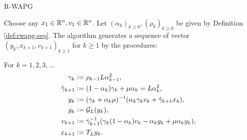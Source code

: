 \documentclass[11pt]{beamer}
\theoremstyle{definition}
\begin{document}
        \begin{frame}{R-WAPG}
            \begin{definition}\label{def:wapg}
                Choose any $x_1 \in \mathbb R^n, v_1 \in \mathbb R^n$.
                Let $(\alpha_k)_{k \ge0}, (\rho_k)_{k \ge 0}$ be given by Definition \ref{def:rwapg-seq}.
                The algorithm generates a sequence of vector $(y_k, x_{k + 1}, v_{k + 1})_{k \ge 1}$ for $k\ge 1$ by the procedures:
                \begin{tcolorbox}
                    For $k=1, 2, 3, \ldots$
                    \begin{align*}
                        \gamma_k &\vcentcolon= \rho_{k -1}L\alpha_{k - 1}^2,
                        \\
                        \hat \gamma_{k + 1} & \vcentcolon= (1 - \alpha_k)\gamma_k + \mu \alpha_k = L\alpha_k^2,
                        \\
                        y_k &\vcentcolon=
                        (\gamma_k + \alpha_k \mu)^{-1}(\alpha_k \gamma_k v_k + \hat\gamma_{k + 1} x_k),
                        \\
                        g_k &\vcentcolon= \mathcal G_L (y_k),
                        \\
                        v_{k + 1} &\vcentcolon=
                        \hat\gamma^{-1}_{k + 1}
                        (\gamma_k(1 - \alpha_k) v_k - \alpha_k g_k + \mu \alpha_k y_k),
                        \\
                        x_{k + 1} &\vcentcolon= T_L y_k.
                    \end{align*}
                \end{tcolorbox}
            \end{definition}
        \end{frame}
\end{document}
